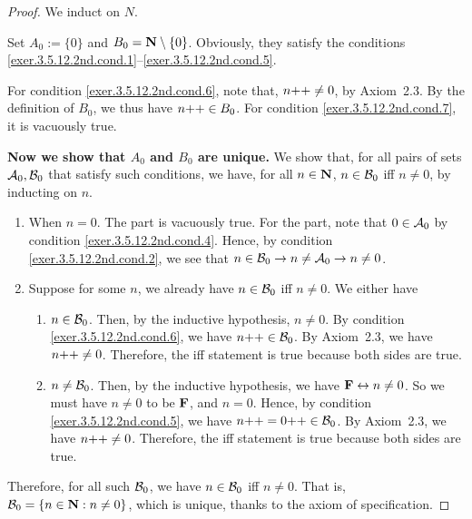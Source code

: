 \begin{proof}
	We induct on $N$.
	
	\mybcbox Set $A_0 := \{0\}$ and $B_0 = \mathbf{N} \setminus \{0\}$. Obviously, they satisfy the conditions \ref{exer.3.5.12.2nd.cond.1}--\ref{exer.3.5.12.2nd.cond.5}.
	
	For condition \ref{exer.3.5.12.2nd.cond.6}, note that, $n{+}{+} \ne 0$, by Axiom~2.3. By the definition of $B_0$, we thus have $n{+}{+} \in B_0$. For condition \ref{exer.3.5.12.2nd.cond.7}, it is vacuously true.
	
	\textbf{Now we show that $A_0$ and $B_0$ are unique.} 
	\begingroup
	\def\azro{{\cal A}_0}
	\def\bzro{{\cal B}_0}
	We show that, for all pairs of sets $\azro,\bzro$ that satisfy such conditions, we have, for all $n \in \mathbf{N}$, $n \in \bzro$ iff $n \ne 0$, by inducting on $n$.
	\begin{enumerate}
		\item \mybcbox When $n = 0$. The \myifbox part is vacuously true. For the \myoifbox part, note that $0 \in \azro$ by condition \ref{exer.3.5.12.2nd.cond.4}. Hence, by condition \ref{exer.3.5.12.2nd.cond.2}, we see that $n \in \bzro \to n \ne \azro \to n \ne 0$.
		
		\item \myisbox Suppose for some $n$, we already have $n \in \bzro$ iff $n \ne 0$. We either have 
		\begin{enumerate}
			\item $n \in \bzro$. Then, by the inductive hypothesis, $n \ne 0$. By condition \ref{exer.3.5.12.2nd.cond.6}, we have $\successor{n} \in \bzro$. By Axiom~2.3, we have $n{+}{+} \ne 0$. Therefore, the iff statement is true because both sides are true.
			
			\item $n \ne \bzro$. Then, by the inductive hypothesis, we have $\mathbf{F} \leftrightarrow n \ne 0$. So we must have $n \ne 0$ to be $\mathbf{F}$, and $n = 0$. Hence, by condition \ref{exer.3.5.12.2nd.cond.5}, we have $\successor{n} = \successor{0} \in \bzro$. By Axiom~2.3, we have $n{+}{+} \ne 0$. Therefore, the iff statement is true because both sides are true.
		\end{enumerate} 
	\end{enumerate}

	Therefore, for all such $\bzro$, we have $n \in \bzro$ iff $n \ne 0$. That is, $\bzro = \{n \in \setn : n \ne 0\}$, which is unique, thanks to the axiom of specification. 
	

\end{proof}
